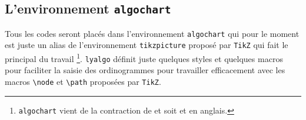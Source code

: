\documentclass[12pt,a4paper]{article}
\begin{document}

\subsection{L'environnement \texttt{algochart}}

Tous les codes seront placés dans l'environnement \verb+algochart+ qui pour le moment est juste un alias de l'environnement \verb+tikzpicture+ proposé par \verb+TikZ+ qui fait le principal du travail
\footnote{
	\texttt{algochart} vient de la contraction de  et  soit  et  en anglais.
}.
\verb+lyalgo+ définit juste quelques styles et quelques macros pour faciliter la saisie des ordinogrammes pour travailler efficacement avec les macros \verb+\node+ et \verb+\path+ proposées par \verb+TikZ+.
\end{document}

